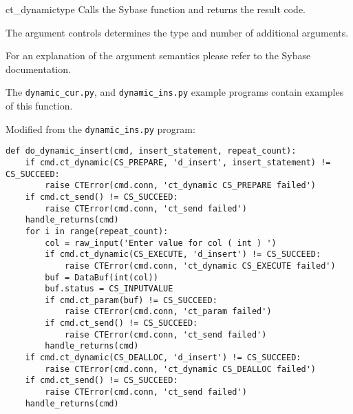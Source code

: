 \begin{methoddesc}[CS_COMMAND]{ct_dynamic}{type \optional{, \ldots}}
Calls the Sybase  function and returns the
result code.

The  argument controls determines the type and number of
additional arguments.








For an explanation of the argument semantics please refer to the
Sybase documentation.

The \texttt{dynamic_cur.py}, and \texttt{dynamic_ins.py} example
programs contain examples of this function.

Modified from the \texttt{dynamic_ins.py} program:
\begin{verbatim}
def do_dynamic_insert(cmd, insert_statement, repeat_count):
    if cmd.ct_dynamic(CS_PREPARE, 'd_insert', insert_statement) != CS_SUCCEED:
        raise CTError(cmd.conn, 'ct_dynamic CS_PREPARE failed')
    if cmd.ct_send() != CS_SUCCEED:
        raise CTError(cmd.conn, 'ct_send failed')
    handle_returns(cmd)
    for i in range(repeat_count):
        col = raw_input('Enter value for col ( int ) ')
        if cmd.ct_dynamic(CS_EXECUTE, 'd_insert') != CS_SUCCEED:
            raise CTError(cmd.conn, 'ct_dynamic CS_EXECUTE failed')
        buf = DataBuf(int(col))
        buf.status = CS_INPUTVALUE
        if cmd.ct_param(buf) != CS_SUCCEED:
            raise CTError(cmd.conn, 'ct_param failed')
        if cmd.ct_send() != CS_SUCCEED:
            raise CTError(cmd.conn, 'ct_send failed')
        handle_returns(cmd)
    if cmd.ct_dynamic(CS_DEALLOC, 'd_insert') != CS_SUCCEED:
        raise CTError(cmd.conn, 'ct_dynamic CS_DEALLOC failed')
    if cmd.ct_send() != CS_SUCCEED:
        raise CTError(cmd.conn, 'ct_send failed')
    handle_returns(cmd)
\end{verbatim}
\end{methoddesc}

